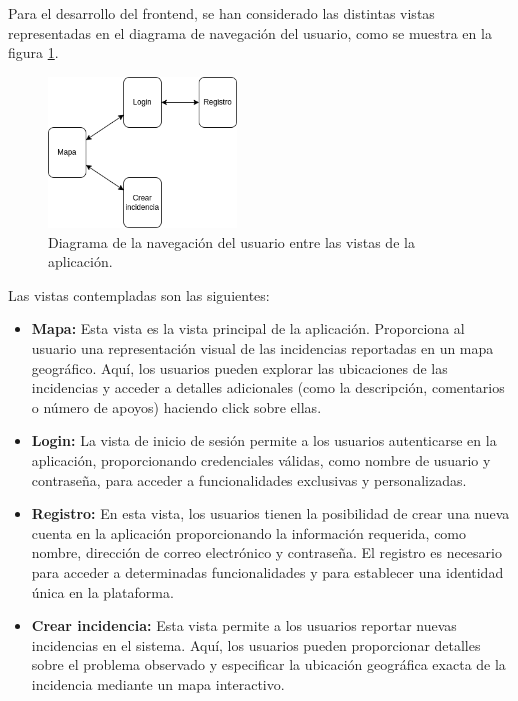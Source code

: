 \documentclass{article}
\begin{document}
Para el desarrollo del frontend, se han considerado las distintas vistas representadas en el diagrama de navegación del usuario, como se muestra en la figura \ref{fig:diagrama_navegacion_usuario}.

\begin{figure}[H]
\centering
\includegraphics[width=5cm]{images/diagrama_vistas.png}
\caption{Diagrama de la navegación del usuario entre las vistas de la aplicación.}
\label{fig:diagrama_navegacion_usuario}
\end{figure}

Las vistas contempladas son las siguientes:

\begin{itemize}
    \item \textbf{Mapa:} Esta vista es la vista principal de la aplicación. Proporciona al usuario una representación visual de las incidencias reportadas en un mapa geográfico. Aquí, los usuarios pueden explorar las ubicaciones de las incidencias y acceder a detalles adicionales (como la descripción, comentarios o número de apoyos) haciendo click sobre ellas. 
    \item \textbf{Login:} La vista de inicio de sesión permite a los usuarios autenticarse en la aplicación, proporcionando credenciales válidas, como nombre de usuario y contraseña, para acceder a funcionalidades exclusivas y personalizadas.
    \item \textbf{Registro:} En esta vista, los usuarios tienen la posibilidad de crear una nueva cuenta en la aplicación proporcionando la información requerida, como nombre, dirección de correo electrónico y contraseña. El registro es necesario para acceder a determinadas funcionalidades y para establecer una identidad única en la plataforma.
    \item \textbf{Crear incidencia:} Esta vista permite a los usuarios reportar nuevas incidencias en el sistema. Aquí, los usuarios pueden proporcionar detalles sobre el problema observado y especificar la ubicación geográfica exacta de la incidencia mediante un mapa interactivo.
\end{itemize}
\end{document}

